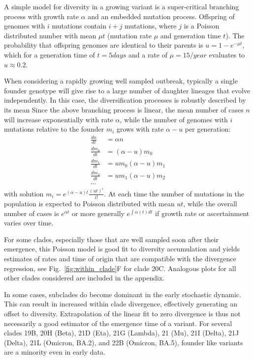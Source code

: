 \documentclass[aps,rmp, twocolumn]{revtex4}
\begin{document}
A simple model for diversity in a growing variant is a super-critical branching process with growth rate $\alpha$ and an embedded mutation process.
Offspring of genomes with $i$ mutations contain $i+j$ mutations, where $j$ is a Poisson distributed number with mean $\mu t$ (mutation rate $\mu$ and generation time $t$).
The probability that offspring genomes are identical to their parents is $u = 1-e^{-\mu t}$, which for a generation time of $t=5days$ and a rate of $\mu = 15/year$ evaluates to $u\approx 0.2$.

When considering a rapidly growing well sampled outbreak, typically a single founder genotype will give rise to a large number of daughter lineages that evolve independently.
In this case, the diversification processes is robustly described by its mean
Since the above branching process is linear, the mean number of cases $n$ will increase exponentially with rate $\alpha$, while the number of genomes with $i$ mutations relative to the founder $m_i$ grows with rate $\alpha - u$ per generation:
\begin{equation}
    \begin{split}
        \frac{dn}{dt} &= \alpha n \\
        \frac{dm_0}{dt} &= (\alpha - u) m_0 \\
        \frac{dm_1}{dt} &= u m_0 (\alpha - u) m_1 \\
        \frac{dm_2}{dt} &= u m_1 (\alpha - u) m_2 \\
        \cdots
    \end{split}
\end{equation}
with solution $m_i = e^{(\alpha - u)t} \frac{(ut)^i}{i!}$.
At each time the number of mutations in the population is expected to Poisson distributed with mean $ut$, while the overall number of cases is $e^{\alpha t}$ or more generally $e^{\int \alpha(t) dt}$ if growth rate or ascertainment varies over time.

For some clades, especially those that are well sampled soon after their emergence, this Poisson model is good fit to diversity accumulation and yields estimates of rates and time of origin that are compatible with the divergence regression, see Fig.~\ref{fig:within_clade}F for clade 20C.
Analogous plots for all other clades considered are included in the appendix.

In some cases, subclades do become dominant in the early stochastic dynamic.
This can result in increased within clade divergence, effectively generating an offset to diversity.
Extrapolation of the linear fit to zero divergence is thus not necessarily a good estimator of the emergence time of a variant.
For several clades 19B, 20H (Beta), 21D (Eta), 21G (Lambda), 21 (Mu), 21I (Delta), 21J (Delta), 21L (Omicron, BA.2), and 22B (Omicron, BA.5), founder like variants are a minority even in early data.
\end{document}
